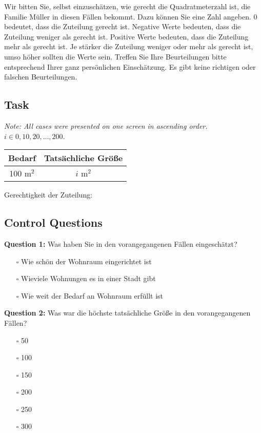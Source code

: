 \documentclass[egregdoesnotlikesansseriftitles]{scrartcl}
\begin{document}
Wir bitten Sie, selbst einzuschätzen, wie gerecht die Quadratmeterzahl ist, die Familie Müller in diesen Fällen bekommt.
Dazu können Sie eine Zahl angeben.
0 bedeutet, dass die Zuteilung gerecht ist.
Negative Werte bedeuten, dass die Zuteilung weniger als gerecht ist.
Positive Werte bedeuten, dass die Zuteilung mehr als gerecht ist.
Je stärker die Zuteilung weniger oder mehr als gerecht ist, umso höher sollten die Werte sein.
Treffen Sie Ihre Beurteilungen bitte entsprechend Ihrer ganz persönlichen Einschätzung.
Es gibt keine richtigen oder falschen Beurteilungen.


\subsection*{Task}
\textit{Note: All cases were presented on one screen in ascending order. $i \in {0, 10, 20, \ldots, 200}$.}

\vspace{1em}
\begin{tabular}{cc}\hline
   Bedarf      & Tatsächliche Größe   \\\hline\hline
   100 m$^2$   & $i$ m$^2$            \\\hline
\end{tabular}

\vspace{1em}
Gerechtigkeit der Zuteilung:


\subsection*{Control Questions}
\noindent\textbf{Question 1:} Was haben Sie in den vorangegangenen Fällen eingeschätzt?
\begin{itemize}
   \item[$\square$] Wie schön der Wohnraum eingerichtet ist
   \item[$\square$] Wieviele Wohnungen es in einer Stadt gibt
   \item[$\square$] Wie weit der Bedarf an Wohnraum erfüllt ist
\end{itemize}

\vspace{1em}
\noindent\textbf{Question 2:} Was war die höchste tatsächliche Größe in den vorangegangenen Fällen?
\begin{itemize}
   \item[$\square$] 50
   \item[$\square$] 100
   \item[$\square$] 150
   \item[$\square$] 200
   \item[$\square$] 250
   \item[$\square$] 300
\end{itemize}
\end{document}
